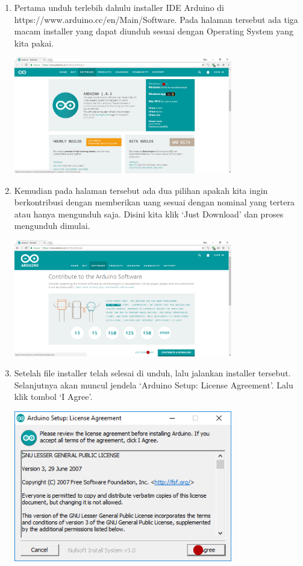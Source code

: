 \begin{enumerate}
\item Pertama unduh terlebih dahulu installer IDE Arduino di https://www.arduino.cc/en/Main/Software. Pada halaman tersebut ada tiga macam installer yang dapat diunduh sesuai dengan Operating System yang kita pakai.
\break\\
\centerline{\includegraphics[width=0.75\textwidth]{figures/aride8.png}}
\item Kemudian pada halaman tersebut ada dua pilihan apakah kita ingin berkontribusi dengan memberikan uang sesuai dengan nominal yang tertera atau hanya mengunduh saja. Disini kita klik `Just Download' dan proses mengunduh dimulai.
\break\\
\centerline{\includegraphics[width=0.75\textwidth]{figures/aride9.png}}
\item Setelah file installer telah selesai di unduh, lalu jalankan installer tersebut. Selanjutnya akan muncul jendela `Arduino Setup: License Agreement'. Lalu klik tombol `I Agree'.
\break\\
\centerline{\includegraphics[width=0.75\textwidth]{figures/aride1.png}}

\end{enumerate}
